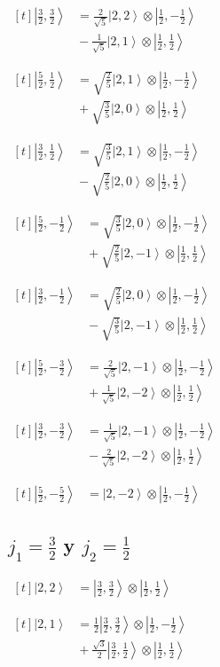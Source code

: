 \documentclass[11pt,a4paper]{article}
\newcommand{\estadocelda}[1]{%
  \begin{minipage}[t]{0.48\linewidth}
  \small\raggedright
  \(\displaystyle\begin{aligned}[t]#1\end{aligned}\)
  \end{minipage}%
}
\newcommand{\ket}[1]{\left|#1\right\rangle}
\begin{document}
\noindent\estadocelda{
\ket{\frac{3}{2},\frac{3}{2}} &= \frac{2}{\sqrt{5}}\ket{2,2}\otimes\ket{\frac{1}{2},-\frac{1}{2}} \\
 &{}-\frac{1}{\sqrt{5}}\ket{2,1}\otimes\ket{\frac{1}{2},\frac{1}{2}}
}\hfill\estadocelda{
\ket{\frac{5}{2},\frac{1}{2}} &= \sqrt{\frac{2}{5}}\ket{2,1}\otimes\ket{\frac{1}{2},-\frac{1}{2}} \\
 &{}+\sqrt{\frac{3}{5}}\ket{2,0}\otimes\ket{\frac{1}{2},\frac{1}{2}}
}\par\addvspace{1.4em}

\noindent\estadocelda{
\ket{\frac{3}{2},\frac{1}{2}} &= \sqrt{\frac{3}{5}}\ket{2,1}\otimes\ket{\frac{1}{2},-\frac{1}{2}} \\
 &{}-\sqrt{\frac{2}{5}}\ket{2,0}\otimes\ket{\frac{1}{2},\frac{1}{2}}
}\hfill\estadocelda{
\ket{\frac{5}{2},-\frac{1}{2}} &= \sqrt{\frac{3}{5}}\ket{2,0}\otimes\ket{\frac{1}{2},-\frac{1}{2}} \\
 &{}+\sqrt{\frac{2}{5}}\ket{2,-1}\otimes\ket{\frac{1}{2},\frac{1}{2}}
}\par\addvspace{1.4em}

\noindent\estadocelda{
\ket{\frac{3}{2},-\frac{1}{2}} &= \sqrt{\frac{2}{5}}\ket{2,0}\otimes\ket{\frac{1}{2},-\frac{1}{2}} \\
 &{}-\sqrt{\frac{3}{5}}\ket{2,-1}\otimes\ket{\frac{1}{2},\frac{1}{2}}
}\hfill\estadocelda{
\ket{\frac{5}{2},-\frac{3}{2}} &= \frac{2}{\sqrt{5}}\ket{2,-1}\otimes\ket{\frac{1}{2},-\frac{1}{2}} \\
 &{}+\frac{1}{\sqrt{5}}\ket{2,-2}\otimes\ket{\frac{1}{2},\frac{1}{2}}
}\par\addvspace{1.4em}

\noindent\estadocelda{
\ket{\frac{3}{2},-\frac{3}{2}} &= \frac{1}{\sqrt{5}}\ket{2,-1}\otimes\ket{\frac{1}{2},-\frac{1}{2}} \\
 &{}-\frac{2}{\sqrt{5}}\ket{2,-2}\otimes\ket{\frac{1}{2},\frac{1}{2}}
}\hfill\estadocelda{
\ket{\frac{5}{2},-\frac{5}{2}} &= \ket{2,-2}\otimes\ket{\frac{1}{2},-\frac{1}{2}}
}\par\addvspace{1.4em}

\subsection{\texorpdfstring{$j_1=\frac{3}{2}$ y $j_2=\frac{1}{2}$}{j1=3/2 y j2=1/2}}

\noindent\estadocelda{
\ket{2,2} &= \ket{\frac{3}{2},\frac{3}{2}}\otimes\ket{\frac{1}{2},\frac{1}{2}}
}\hfill\estadocelda{
\ket{2,1} &= \frac{1}{2}\ket{\frac{3}{2},\frac{3}{2}}\otimes\ket{\frac{1}{2},-\frac{1}{2}} \\
 &{}+\frac{\sqrt{3}}{2}\ket{\frac{3}{2},\frac{1}{2}}\otimes\ket{\frac{1}{2},\frac{1}{2}}
}\par\addvspace{1.4em}
\end{document}
